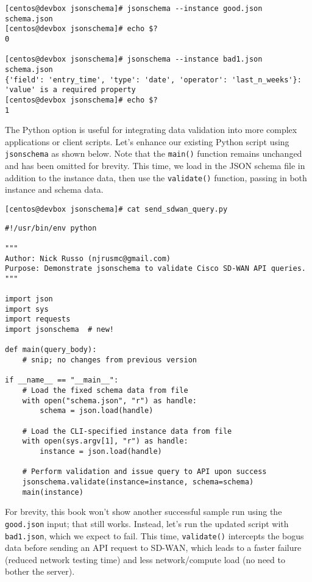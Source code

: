 \begin{verbatim}
[centos@devbox jsonschema]# jsonschema --instance good.json schema.json
[centos@devbox jsonschema]# echo $?
0

[centos@devbox jsonschema]# jsonschema --instance bad1.json schema.json
{'field': 'entry_time', 'type': 'date', 'operator': 'last_n_weeks'}: 'value' is a required property
[centos@devbox jsonschema]# echo $?
1
\end{verbatim}

The Python option is useful for integrating data validation into more
complex applications or client scripts. Let's enhance our existing Python
script using \verb|jsonschema| as shown below. Note that the \verb|main()|
function remains unchanged and has been omitted for brevity. This time,
we load in the JSON schema file in addition to the instance data, then
use the \verb|validate()| function, passing in both instance and schema data.

\begin{verbatim}
[centos@devbox jsonschema]# cat send_sdwan_query.py
\end{verbatim}

\begin{verbatim}
#!/usr/bin/env python

"""
Author: Nick Russo (njrusmc@gmail.com)
Purpose: Demonstrate jsonschema to validate Cisco SD-WAN API queries.
"""

import json
import sys
import requests
import jsonschema  # new!

def main(query_body):
    # snip; no changes from previous version

if __name__ == "__main__":
    # Load the fixed schema data from file
    with open("schema.json", "r") as handle:
        schema = json.load(handle)

    # Load the CLI-specified instance data from file
    with open(sys.argv[1], "r") as handle:
        instance = json.load(handle)

    # Perform validation and issue query to API upon success
    jsonschema.validate(instance=instance, schema=schema)
    main(instance)
\end{verbatim}

For brevity, this book won't show another successful sample run
using the \verb|good.json| input; that still works. Instead, let's
run the updated script with \verb|bad1.json|, which we expect to fail.
This time, \verb|validate()| intercepts the bogus data before sending an
API request to SD-WAN, which leads to a faster failure (reduced
network testing time) and less network/compute load (no need to
bother the server).

